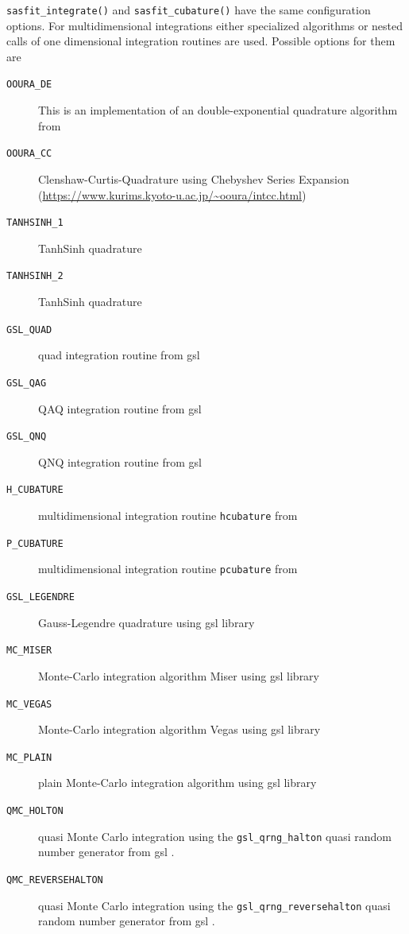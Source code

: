 \texttt{sasfit\_integrate()}  and \texttt{sasfit\_cubature()} have the same configuration options. For multidimensional integrations either specialized algorithms or nested calls of one dimensional integration routines are used. Possible options for them are
\begin{description}
   \item[\texttt{OOURA\_DE}] This is an implementation of an double-exponential quadrature algorithm from \cite{Mori1990,Mori2001}
   \item[\texttt{OOURA\_CC}] Clenshaw-Curtis-Quadrature using Chebyshev Series Expansion (\url{https://www.kurims.kyoto-u.ac.jp/~ooura/intcc.html})
   \item[\texttt{TANHSINH\_1}] TanhSinh quadrature \cite{Engelen2021,Engelen}
   \item[\texttt{TANHSINH\_2}] TanhSinh quadrature \cite{Engelen2021,Engelena}
   \item[\texttt{GSL\_QUAD}] quad integration routine from gsl \cite{Galassi2021}
   \item[\texttt{GSL\_QAG}] QAQ integration routine from gsl \cite{Galassi2021}
   \item[\texttt{GSL\_QNQ}] QNQ integration routine from gsl \cite{Galassi2021}
   \item[\texttt{H\_CUBATURE}] multidimensional integration routine \texttt{hcubature} from \cite{Johnson2017}
   \item[\texttt{P\_CUBATURE}] multidimensional integration routine \texttt{pcubature} from \cite{Johnson2017}
   \item[\texttt{GSL\_LEGENDRE}] Gauss-Legendre quadrature using gsl library  \cite{Galassi2021}
   \item[\texttt{MC\_MISER}] Monte-Carlo integration algorithm Miser using gsl library  \cite{Galassi2021}
   \item[\texttt{MC\_VEGAS}]  Monte-Carlo integration algorithm Vegas using gsl library  \cite{Galassi2021}
   \item[\texttt{MC\_PLAIN}]  plain Monte-Carlo integration algorithm using gsl library  \cite{Galassi2021}
   \item[\texttt{QMC\_HOLTON}] quasi Monte Carlo integration \cite{Zaslavsky2023} using the \texttt{gsl\_qrng\_halton} quasi random number generator from gsl \cite{Galassi2021}.
   \item[\texttt{QMC\_REVERSEHALTON}] quasi Monte Carlo integration \cite{Zaslavsky2023} using the \texttt{gsl\_qrng\_reversehalton} quasi random number generator from gsl \cite{Galassi2021}.

\end{description}
